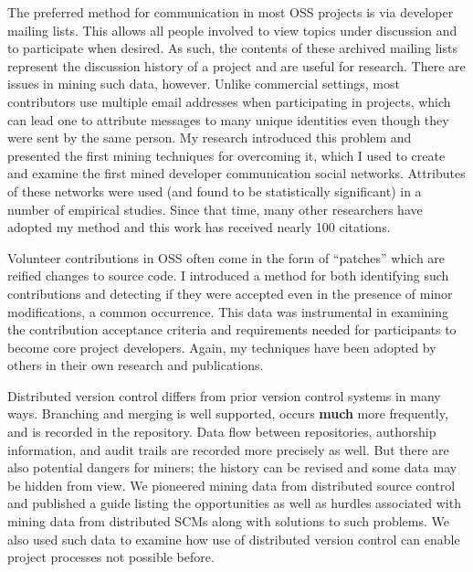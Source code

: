 \documentclass[10pt]{article}
\begin{document}
\begin{small}
The preferred method for communication in most OSS projects is via developer
mailing lists.  This allows all people involved to view topics under discussion
and to participate when desired.  As such, the contents of these archived
mailing lists represent the discussion history of a project and are useful for
research.  There are issues in mining such data, however.  Unlike commercial
settings, most contributors use multiple email addresses when participating in
projects, which can lead one to attribute messages to many unique identities
even though they were sent by the same person.  My research introduced this
problem and presented the first mining techniques for overcoming it, which I
used to create and examine the first mined developer communication social
networks.  Attributes of these networks were used (and found to be
statistically significant) in a number of empirical studies.  Since that time,
many other researchers have adopted my method and
this work has received nearly 100 citations.

Volunteer contributions in OSS often come in the form of ``patches'' which are
reified changes to source code.  I introduced a method for both identifying
such contributions and detecting if they were accepted even in the presence of
minor modifications, a common occurrence.  This data was instrumental in
examining the contribution acceptance criteria and requirements needed for
participants to become core project developers.  Again, my techniques have
been adopted by others in their own research and publications.

Distributed version control differs from prior version control systems in many
ways.  Branching and merging is well supported, occurs \textbf{much} more
frequently, and is recorded in the repository.  Data flow between repositories,
authorship information, and audit trails are recorded more precisely as well.
But there are also potential dangers for miners; the history can be revised and
some data may be hidden from view.  We pioneered mining data from distributed
source control and published a guide listing the opportunities as well as
hurdles associated with mining data from distributed SCMs along with solutions
to such problems.  We also used such data to examine how use of distributed version 
control can enable project processes not possible before.


\end{small}
\end{document}
